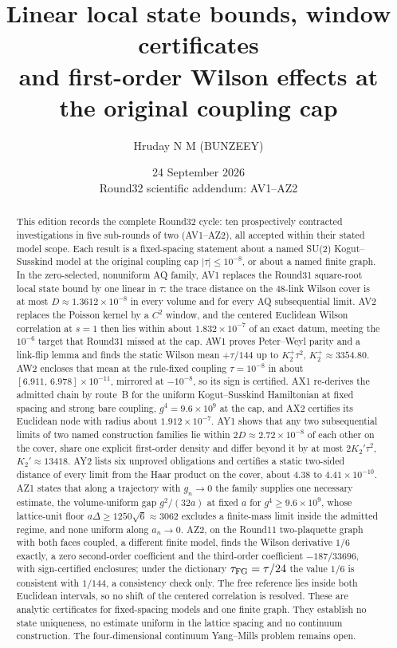 \documentclass[11pt,a4paper]{article}
\title{Linear local state bounds, window certificates\\
and first-order Wilson effects at the original coupling cap}
\author{Hruday N M (BUNZEEY)}
\date{24 September 2026\\\small Round32 scientific addendum: AV1--AZ2}
\begin{document}
\maketitle
\begin{abstract}
This edition records the complete Round32 cycle: ten prospectively contracted
investigations in five sub-rounds of two (AV1--AZ2), all accepted within
their stated model scope. Each result is a fixed-spacing statement about a
named SU(2) Kogut--Susskind model at the original coupling cap
$|\tau|\le10^{-8}$, or about a named finite graph. In the zero-selected,
nonuniform AQ family, AV1 replaces the Round31 square-root local state bound
by one linear in $\tau$: the trace distance on the 48-link Wilson cover is at
most $D\approx1.3612\times10^{-8}$ in every volume and for every AQ
subsequential limit. AV2 replaces the Poisson kernel by a $C^2$ window, and
the centered Euclidean Wilson correlation at $s=1$ then lies within about
$1.832\times10^{-7}$ of an exact datum, meeting the $10^{-6}$ target that
Round31 missed at the cap. AW1 proves Peter--Weyl parity and a link-flip lemma
and finds the static Wilson mean $+\tau/144$ up to $K_2^+\tau^2$,
$K_2^+\approx3354.80$. AW2 encloses that mean at the rule-fixed coupling
$\tau=10^{-8}$ in about $[6.911,\,6.978]\times10^{-11}$, mirrored at
$-10^{-8}$, so its sign is certified. AX1 re-derives the admitted chain by
route~B for the uniform Kogut--Susskind Hamiltonian at fixed spacing and
strong bare coupling, $g^4=9.6\times10^9$ at the cap, and AX2 certifies its
Euclidean node with radius about $1.912\times10^{-7}$. AY1 shows that any two
subsequential limits of two named construction families lie within
$2D\approx2.72\times10^{-8}$ of each other on the cover, share one explicit
first-order density and differ beyond it by at most $2K_2'\tau^2$,
$K_2'\approx13418$. AY2 lists six unproved obligations and certifies a static
two-sided distance of every limit from the Haar product on the cover, about
$4.38$ to $4.41\times10^{-10}$. AZ1 states that along a trajectory with
$g_n\to0$ the family supplies one necessary estimate, the volume-uniform gap
$g^2/(32a)$ at fixed $a$ for $g^4\ge9.6\times10^9$, whose lattice-unit floor
$a\Delta\ge1250\sqrt6\approx3062$ excludes a finite-mass limit inside the
admitted regime, and none uniform along $a_n\to0$. AZ2, on the Round11
two-plaquette graph with both faces coupled, a different finite model, finds
the Wilson derivative $1/6$ exactly, a zero second-order coefficient and the
third-order coefficient $-187/33696$, with sign-certified enclosures; under
the dictionary $\tau_{\rm FG}=\tau/24$ the value $1/6$ is consistent with
$1/144$, a consistency check only. The free reference lies inside both
Euclidean intervals, so no shift of the centered correlation is resolved.
These are analytic certificates for fixed-spacing models and one finite
graph. They establish no state uniqueness, no estimate uniform in the lattice
spacing and no continuum construction. The four-dimensional continuum
Yang--Mills problem remains open.
\end{abstract}
\end{document}
